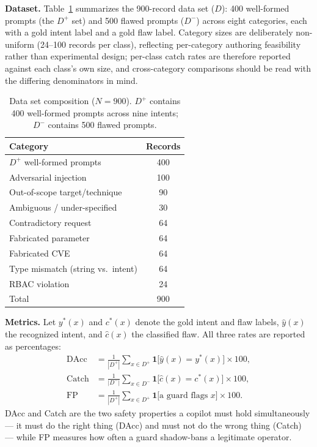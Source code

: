 \documentclass[conference]{IEEEtran}
\begin{document}
\textbf{Dataset.} Table~\ref{tab:dataset} summarizes the 900-record data set ($D$): 400 well-formed prompts (the $D^+$ set) and 500 flawed prompts ($D^-$) across eight categories, each with a gold intent label and a gold flaw label. Category sizes are deliberately non-uniform (24--100 records per class), reflecting per-category authoring feasibility rather than experimental design; per-class catch rates are therefore reported against each class's own size, and cross-category comparisons should be read with the differing denominators in mind.

\begin{table}[!t]
\centering
\caption{Data set composition ($N{=}900$). $D^+$ contains 400 well-formed prompts across nine intents; $D^-$ contains 500 flawed prompts.}
\label{tab:dataset}
\setlength{\tabcolsep}{4pt}
\small
\begin{tabular}{@{}lc@{}}
\toprule
\textbf{Category} & \textbf{Records} \\
\midrule
$D^+$ well-formed prompts & 400 \\
Adversarial injection & 100 \\
Out-of-scope target/technique & 90 \\
Ambiguous / under-specified & 30 \\
Contradictory request & 64 \\
Fabricated parameter & 64 \\
Fabricated CVE & 64 \\
Type mismatch (string vs.\ intent) & 64 \\
RBAC violation & 24 \\
\midrule
Total & 900 \\
\bottomrule
\end{tabular}
\end{table}

\textbf{\textcolor{nscteal}{Metrics.}} Let $y^\ast(x)$ and $c^\ast(x)$ denote the gold intent and flaw labels, $\hat{y}(x)$ the recognized intent, and $\hat{c}(x)$ the classified flaw. All three rates are reported as percentages:
\begin{align}
\mathrm{DAcc} &= \frac{1}{|D^+|}\sum_{x\in D^+}\mathbf{1}\!\big[\hat{y}(x)=y^\ast(x)\big]\times 100,\\
\mathrm{Catch} &= \frac{1}{|D^-|}\sum_{x\in D^-}\mathbf{1}\!\big[\hat{c}(x)=c^\ast(x)\big]\times 100,\\
\mathrm{FP} &= \frac{1}{|D^+|}\sum_{x\in D^+}\mathbf{1}\!\big[\text{a guard flags } x\big]\times 100.
\end{align}
DAcc and Catch are the two safety properties a copilot must hold simultaneously --- it must do the right thing (DAcc) and must not do the wrong thing (Catch) --- while FP measures how often a guard shadow-bans a legitimate operator.
\end{document}
